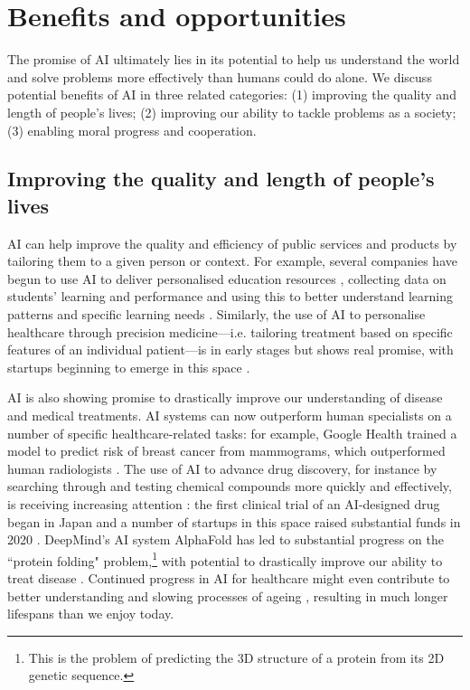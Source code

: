 \documentclass{article}
\begin{document}
\section{Benefits and opportunities}

The promise of AI ultimately lies in its potential to help us understand the world and solve problems more effectively than humans could do alone. We discuss potential benefits of AI in three related categories: (1) improving the quality and length of people’s lives; (2) improving our ability to tackle problems as a society; (3) enabling moral progress and cooperation.

\subsection{Improving the quality and length of people’s lives}

AI can help improve the quality and efficiency of public services and products by tailoring them to a given person or context. For example, several companies have begun to use AI to deliver personalised education resources \citep{hao_china_2019}, collecting data on students’ learning and performance and using this to better understand learning patterns and specific learning needs \citep{luan_review_2021}. Similarly, the use of AI to personalise healthcare through precision medicine---i.e. tailoring treatment based on specific features of an individual patient---is in early stages but shows real promise\citep{xu_translating_2019,johnson_precision_2021}, with startups beginning to emerge in this space \citep{toews_these_2020}.

AI is also showing promise to drastically improve our understanding of disease and medical treatments. AI systems can now outperform human specialists on a number of specific healthcare-related tasks: for example, Google Health trained a model to predict risk of breast cancer from mammograms, which outperformed human radiologists \citep{mckinney_international_2020}. The use of AI to advance drug discovery, for instance by searching through and testing chemical compounds more quickly and effectively, is receiving increasing attention \citep{paul_artificial_2021}: the first clinical trial of an AI-designed drug began in Japan \citep{burki_new_2020} and a number of startups in this space raised substantial funds in 2020 \citep{hogarth_state_2020}. DeepMind’s AI system AlphaFold has led to substantial progress on the ``protein folding" problem,\footnote{This is the problem of predicting the 3D structure of a protein from its 2D genetic sequence.} with potential to drastically improve our ability to treat disease \citep{jumper_highly_2021}. Continued progress in AI for healthcare might even contribute to better understanding and slowing processes of ageing \citep{zhavoronkov_artificial_2019}, resulting in much longer lifespans than we enjoy today.
\end{document}

